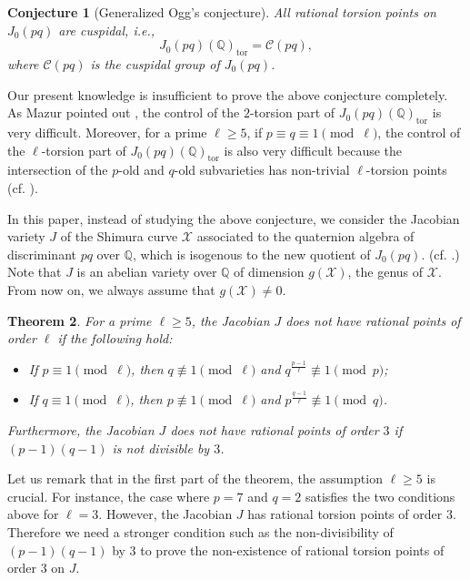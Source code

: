 \documentclass[a4paper, 12pt]{amsart}
\newtheorem{thm}{Theorem}[section]
\newtheorem{conj}[thm]{Conjecture}
\theoremstyle{definition}
\theoremstyle{remark}
\numberwithin{equation}{section} \numberwithin{table}{section}
\begin{document}
\begin{conj}[Generalized Ogg's conjecture]
All rational torsion points on $J_0(pq)$ are cuspidal, i.e.,
$$
J_0(pq)({{\mathbb{Q}}})_{{\mathrm{tor}}} = {{\mathcal{C}}}(pq),
$$
where ${{\mathcal{C}}}(pq)$ is the cuspidal group of $J_0(pq)$.
\end{conj}
Our present knowledge is insufficient to prove the above conjecture completely. As Mazur pointed out \cite[p. 34]{M77}, the control of the $2$-torsion part of $J_0(pq)({{\mathbb{Q}}})_{{\mathrm{tor}}}$ is very difficult. Moreover, for a prime $\ell\geq 5$, if $p \equiv q \equiv 1 {{ \!\pmod {\ell}}}$, the control of the $\ell$-torsion part of $J_0(pq)({{\mathbb{Q}}})_{{\mathrm{tor}}}$ is also very difficult because the intersection of the $p$-old and $q$-old subvarieties has non-trivial $\ell$-torsion points (cf. \cite[Theorem 1]{R89}).

In this paper, instead of studying the above conjecture, we consider the Jacobian variety $J$ of the Shimura curve ${{\mathcal{X}}}$ associated to the quaternion algebra of discriminant $pq$ over ${{\mathbb{Q}}}$, which is isogenous to the new quotient of $J_0(pq)$. (cf. \cite[Th\`eor\`eme 2]{R80}.) 
Note that $J$ is an abelian variety over ${{\mathbb{Q}}}$ of dimension $g({{\mathcal{X}}})$, the genus of ${{\mathcal{X}}}$. 
From now on, we always assume that $g({{\mathcal{X}}}) \neq 0$. 

\begin{thm}\label{thm:maintheorem}
For a prime $\ell\geq 5$, the Jacobian $J$ does not have rational points of order $\ell$ if the following hold:
\begin{itemize}
\item If $p\equiv 1 {{ \!\pmod {\ell}}}$, then $q\not\equiv 1 {{ \!\pmod {\ell}}}$ and $q^{\frac{p-1}{\ell}} \not\equiv 1 \pmod p$;
\item If $q\equiv 1 {{ \!\pmod {\ell}}}$, then $p\not\equiv 1 {{ \!\pmod {\ell}}}$ and $p^{\frac{q-1}{\ell}} \not\equiv 1 \pmod q$.
\end{itemize}
Furthermore, the Jacobian $J$ does not have rational points of order $3$ if $(p-1)(q-1)$ is not divisible by $3$.
\end{thm}

Let us remark that in the first part of the theorem, the assumption $\ell \geq 5$ is crucial. For instance, the case where $p=7$ and $q=2$ satisfies the two conditions above for $\ell=3$. However, the Jacobian $J$ has rational torsion points of order $3$. Therefore we need a stronger condition such as the non-divisibility of $(p-1)(q-1)$ by $3$ to prove the non-existence of rational torsion points of order $3$ on $J$.
\end{document}
